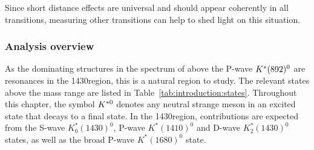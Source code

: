 Since short distance effects are universal and should appear coherently in all \btosmm transitions, measuring other \btosmm transitions can help to shed light on this situation.


\subsubsection{Analysis overview}

As the dominating structures in the \kpi spectrum of \BdToKpimm above the P-wave ${{K}^*}(892)^{0}$ are resonances in the 1430\mevcc region, this is a natural region to study. The relevant \Kstarz states above the \KstP mass range are listed in Table~\ref{tab:introduction:states}. Throughout this chapter, the symbol ${{K}^{*0}}$ denotes any neutral strange meson in an excited state that decays to a \Kp\pim final state. In the 1430\mevcc region, contributions are expected from the S-wave $K^\ast_0(1430)^0$, P-wave $K^\ast(1410)^0$ and D-wave $K^\ast_2(1430)^0$ states, as well as the broad P-wave $K^\ast(1680)^0$ state. 

